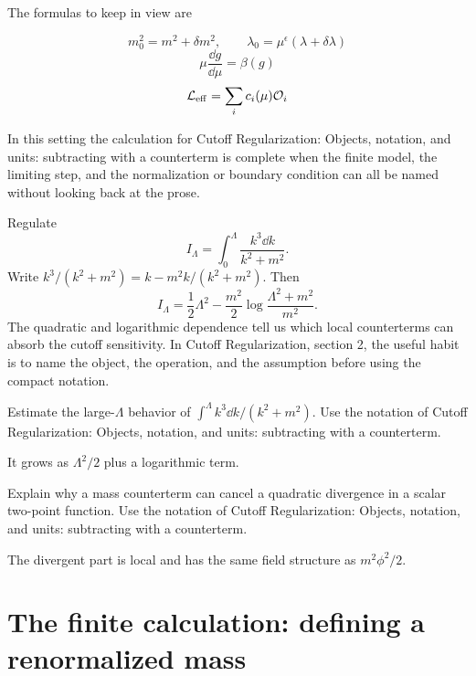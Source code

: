 The formulas to keep in view are

\[
  m_0^2=m^2+\delta m^2,\qquad \lambda_0=\mu^\epsilon(\lambda+\delta\lambda)
\]
\[
  \mu\frac{\dd g}{\dd\mu}=\beta(g)
\]
\[
  \mathcal L_{\mathrm{eff}}=\sum_i c_i(\mu)\mathcal O_i
\]

In this setting the calculation for Cutoff Regularization: Objects, notation, and units: subtracting with a counterterm is complete when the finite model, the limiting step, and the normalization or boundary condition can all be named without looking back at the prose.




\begin{example}
Regulate
\[
  I_\Lambda=\int_0^\Lambda\frac{k^3\dd k}{k^2+m^2}.
\]
Write \(k^3/(k^2+m^2)=k-m^2k/(k^2+m^2)\).  Then
\[
  I_\Lambda=\frac12\Lambda^2-\frac{m^2}{2}\log\frac{\Lambda^2+m^2}{m^2}.
\]
The quadratic and logarithmic dependence tell us which local counterterms can absorb the cutoff sensitivity.  In Cutoff Regularization, section 2, the useful habit is to name the object, the operation, and the assumption before using the compact notation.
\end{example}



\begin{exercise}
Estimate the large-\(\Lambda\) behavior of \(\int^\Lambda k^3\dd k/(k^2+m^2)\).  Use the notation of Cutoff Regularization: Objects, notation, and units: subtracting with a counterterm.
\begin{answer}
It grows as \(\Lambda^2/2\) plus a logarithmic term.
\end{answer}
\end{exercise}

\begin{exercise}
Explain why a mass counterterm can cancel a quadratic divergence in a scalar two-point function.  Use the notation of Cutoff Regularization: Objects, notation, and units: subtracting with a counterterm.
\begin{answer}
The divergent part is local and has the same field structure as \(m^2\phi^2/2\).
\end{answer}
\end{exercise}



\section{The finite calculation: defining a renormalized mass}

